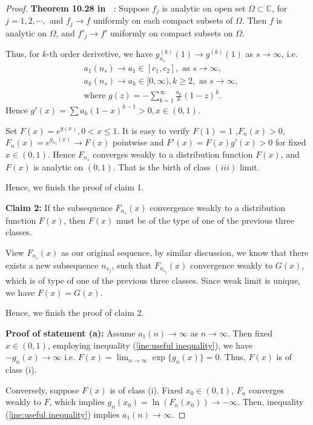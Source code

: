 \documentclass[12pt]{article}
\theoremstyle{plain}
\theoremstyle{definition}
\theoremstyle{remark}
\begin{document}
\begin{proof}
\textbf{Theorem 10.28 in ~\cite{RudinComplex}}: Suppose $f_j$ is analytic on open set $\Omega\subset \mathbb{C}$, for $j=1,2,\cdots,$ and $f_j\rightarrow f$ uniformly on each compact subsets of $\Omega$. Then $f$ is analytic on $\Omega$, and $f'_j\rightarrow f'$ uniformly on compact subsets on $\Omega$.


Thus, for $k$-th order derivetive, we have $g_{n_s}^{(k)}(1)\rightarrow g^{(k)}(1)$ as $s\rightarrow \infty$, i.e. 
\begin{align*}
    &a_{1}{(n_s)}\rightarrow a_1 \in [c_1,c_2], \text{ as } s\rightarrow \infty,\\
    &a_{k}{(n_s)}\rightarrow a_k \in [0,\infty),k\geq 2, \text{ as } s\rightarrow \infty,\\
    &\text{where }g(z)=-\sum_{k=1}^\infty \frac{a_k}{k}(1-z)^k.
\end{align*}
Hence $g'(x)=\sum a_k (1-x)^{k-1}>0, x\in (0,1)$.

Set $F(x)=e^{g(x)},0<x\leq 1$. It is easy to verify $F(1)=1$ ,$ F_n(x)>0$, $F_n(x)=e^{g_{n_s}(x)}\rightarrow F(x)$ pointwise and $F'(x)=F(x)g'(x)>0$ for fixed $x\in(0,1)$. Hence $F_{n_s}$ converges weakly to a distribution function $F(x)$, and $F(x)$ is analytic on $(0,1)$. That is the birth of class $(iii)$ limit.

Hence, we finish the proof of claim 1.

\textbf{Claim 2:} If the subsequence $F_{n_s}(x)$ convergence weakly to a distribution function $F(x)$, then $F(x)$ must be of the type of one of the previous three classes.

View $F_{n_s}(x)$ as our original sequence, by similar discussion, we know that there exists a new subsequence $n_{s_{j}}$, such that $F_{n_{s_j}}(x)$ convergence weakly to $G(x)$, which is of type of one of the previous three classes. Since weak limit is unique, we have $F(x)=G(x)$. 

Hence, we finish the proof of claim 2.




\textbf{Proof of statement (a):}
    Assume $a_1{(n)}\rightarrow \infty$ as $n\rightarrow \infty$. Then fixed $x\in(0,1)$, employing inequality (\ref{ine:useful inequality}), we have $-g_{n}(x)\rightarrow \infty$ i.e. $F(x)=\lim_{n\rightarrow\infty}\exp\{g_{n}(x)\}=0$. Thus, $F(x)$ is of class (i).
    
    Conversely, suppose $F(x)$ is of class (i). Fixed $x_0\in (0,1)$, $F_{n}$ converges weakly to $F$, which implies $g_{n}(x_0)=\ln(F_{n}(x_0))\rightarrow -\infty$. Then, inequality (\ref{ine:useful inequality}) implies $a_1{(n)}\rightarrow \infty$.


\end{proof}
\end{document}
